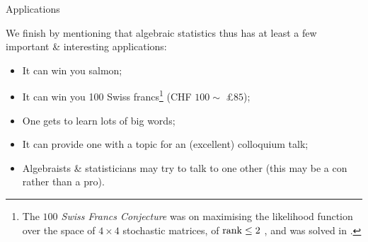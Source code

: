 \begin{frame}{Applications}

We finish by mentioning that algebraic statistics thus has at least a few important \& interesting applications:

\begin{itemize}
    \item It can win you salmon;
    \item It can win you 100 Swiss francs\footnote{The \emph{$100$ Swiss Francs Conjecture} was on maximising the likelihood function over the space of $4 \times 4$ stochastic matrices, of $\rank \leq 2$ \cite{BS2009}, and was solved in \cite{MZGJSG20011}.} (CHF $100 \sim$ £$85$);
    \item One gets to learn lots of big words;
    \item It can provide one with a topic for an (excellent) colloquium talk;
    \item Algebraists \& statisticians may try to talk to one other (this may be a con rather than a pro).
\end{itemize}

\end{frame}